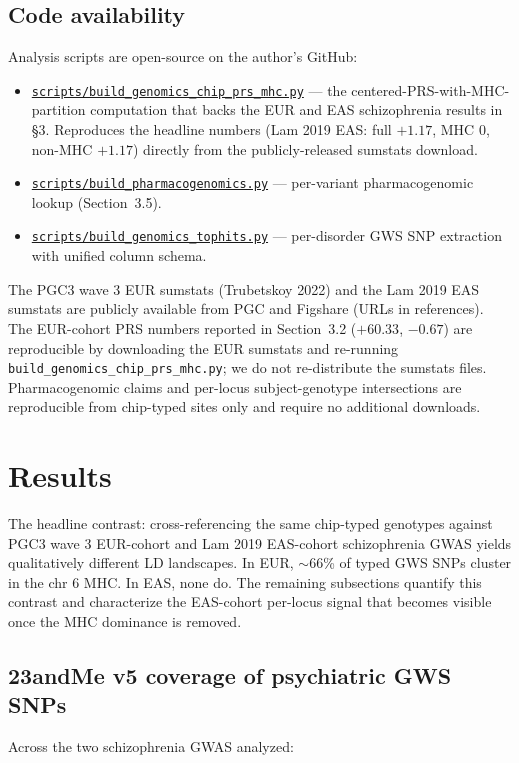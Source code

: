 \documentclass[11pt,a4paper]{article}
\begin{document}
\subsection{Code availability}
Analysis scripts are open-source on the author's GitHub:
\begin{itemize}
\item \href{https://github.com/daliu/daliu.github.io/blob/master/scripts/build_genomics_chip_prs_mhc.py}{\texttt{scripts/build\_genomics\_chip\_prs\_mhc.py}} --- the centered-PRS-with-MHC-partition computation that backs the EUR and EAS schizophrenia results in \S3. Reproduces the headline numbers (Lam 2019 EAS: full $+1.17$, MHC $0$, non-MHC $+1.17$) directly from the publicly-released sumstats download.
\item \href{https://github.com/daliu/daliu.github.io/blob/master/scripts/build_pharmacogenomics.py}{\texttt{scripts/build\_pharmacogenomics.py}} --- per-variant pharmacogenomic lookup (Section~3.5).
\item \href{https://github.com/daliu/daliu.github.io/blob/master/scripts/build_genomics_tophits.py}{\texttt{scripts/build\_genomics\_tophits.py}} --- per-disorder GWS SNP extraction with unified column schema.
\end{itemize}
The PGC3 wave 3 EUR sumstats (Trubetskoy 2022) and the Lam 2019 EAS sumstats are publicly available from PGC and Figshare (URLs in references). The EUR-cohort PRS numbers reported in Section~3.2 ($+60.33$, $-0.67$) are reproducible by downloading the EUR sumstats and re-running \texttt{build\_genomics\_chip\_prs\_mhc.py}; we do not re-distribute the sumstats files. Pharmacogenomic claims and per-locus subject-genotype intersections are reproducible from chip-typed sites only and require no additional downloads.

\section{Results}

The headline contrast: cross-referencing the same chip-typed genotypes against PGC3 wave 3 EUR-cohort and Lam 2019 EAS-cohort schizophrenia GWAS yields qualitatively different LD landscapes. In EUR, $\sim$66\% of typed GWS SNPs cluster in the chr 6 MHC. In EAS, none do. The remaining subsections quantify this contrast and characterize the EAS-cohort per-locus signal that becomes visible once the MHC dominance is removed.

\subsection{23andMe v5 coverage of psychiatric GWS SNPs}
Across the two schizophrenia GWAS analyzed:
\end{document}
